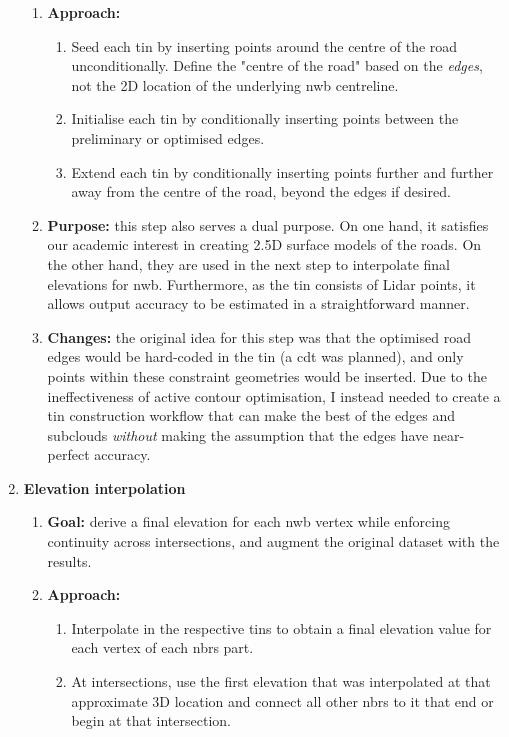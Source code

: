 \begin{enumerate}
\begin{enumerate}
        \item \textbf{Approach:}
        \begin{enumerate}
            \item Seed each \ac{tin} by inserting points around the centre of the road unconditionally. Define the "centre of the road" based on the \textit{edges}, not the 2D location of the underlying \ac{nwb} centreline.
            \item Initialise each \ac{tin} by conditionally inserting points between the preliminary or optimised edges.
            \item Extend each \ac{tin} by conditionally inserting points further and further away from the centre of the road, beyond the edges if desired. 
        \end{enumerate}
        \item \textbf{Purpose:} this step also serves a dual purpose. On one hand, it satisfies our academic interest in creating 2.5D surface models of the roads. On the other hand, they are used in the next step to interpolate final elevations for \ac{nwb}. Furthermore, as the \ac{tin} consists of Lidar points, it allows output accuracy to be estimated in a straightforward manner.
        \item \textbf{Changes:} the original idea for this step was that the optimised road edges would be hard-coded in the \ac{tin} (a \ac{cdt} was planned), and only points within these constraint geometries would be inserted. Due to the ineffectiveness of active contour optimisation, I instead needed to create a \ac{tin} construction workflow that can make the best of the edges and subclouds \textit{without} making the assumption that the edges have near-perfect accuracy.
    \end{enumerate}
    \item \textbf{Elevation interpolation}
    \begin{enumerate}
        \item \textbf{Goal:} derive a final elevation for each \ac{nwb} vertex while enforcing continuity across intersections, and augment the original dataset with the results.
        \item \textbf{Approach:}
        \begin{enumerate}
            \item Interpolate in the respective \ac{tin}s to obtain a final elevation value for each vertex of each \ac{nbrs} part.
            \item At intersections, use the first elevation that was interpolated at that approximate 3D location and connect all other \ac{nbrs} to it that end or begin at that intersection.

\end{enumerate}
\end{enumerate}
\end{enumerate}
